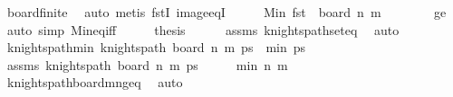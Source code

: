 \begin{isabellebody}
\ board{\isacharunderscore}{\kern0pt}finite\ \isamarkupfalse%
\ auto\ {\isacharparenleft}{\kern0pt}metis\ fstI\ image{\isacharunderscore}{\kern0pt}eqI{\isacharparenright}{\kern0pt}\isanewline
\ \ \isamarkupfalse%
\ \isamarkupfalse%
\ {\isachardoublequoteopen}Min\ {\isacharparenleft}{\kern0pt}{\isacharparenleft}{\kern0pt}fst{\isacharparenright}{\kern0pt}\ {\isacharbackquote}{\kern0pt}\ board\ n\ m{\isacharparenright}{\kern0pt}\ {\isacharequal}{\kern0pt}\ {}{\isachardoublequoteclose}\isanewline
\ \ \ \ \isamarkupfalse%
\ ge{\isacharunderscore}{\kern0pt}{}\ \isamarkupfalse%
\ {\isacharparenleft}{\kern0pt}auto\ simp{\isacharcolon}{\kern0pt}\ Min{\isacharunderscore}{\kern0pt}eq{\isacharunderscore}{\kern0pt}iff{\isacharparenright}{\kern0pt}\isanewline
\ \ \isamarkupfalse%
\ \isamarkupfalse%
\ {\isacharquery}{\kern0pt}thesis\isanewline
\ \ \ \ \isamarkupfalse%
\ assms\ knights{\isacharunderscore}{\kern0pt}path{\isacharunderscore}{\kern0pt}set{\isacharunderscore}{\kern0pt}eq\ \isamarkupfalse%
\ auto\isanewline
{}\isamarkupfalse%
%
\endisatagproof
{\isafoldproof}%
%
\isadelimproof
\isanewline
%
\endisadelimproof
\isanewline
{}\isamarkupfalse%
\ knights{\isacharunderscore}{\kern0pt}path{\isacharunderscore}{\kern0pt}min{}{\isacharcolon}{\kern0pt}\ {\isachardoublequoteopen}knights{\isacharunderscore}{\kern0pt}path\ {\isacharparenleft}{\kern0pt}board\ n\ m{\isacharparenright}{\kern0pt}\ ps\ {\isasymLongrightarrow}\ min{}\ ps\ {\isacharequal}{\kern0pt}\ {}{\isachardoublequoteclose}\isanewline
%
\isadelimproof
%
\endisadelimproof
%
\isatagproof
{}\isamarkupfalse%
\ {\isacharminus}{\kern0pt}\isanewline
\ \ \isamarkupfalse%
\ assms{\isacharcolon}{\kern0pt}\ {\isachardoublequoteopen}knights{\isacharunderscore}{\kern0pt}path\ {\isacharparenleft}{\kern0pt}board\ n\ m{\isacharparenright}{\kern0pt}\ ps{\isachardoublequoteclose}\isanewline
\ \ \isamarkupfalse%
\ \isamarkupfalse%
\ {\isachardoublequoteopen}min\ n\ m\ {\isasymge}\ {}{\isachardoublequoteclose}\isanewline
\ \ \ \ \isamarkupfalse%
\ knights{\isacharunderscore}{\kern0pt}path{\isacharunderscore}{\kern0pt}board{\isacharunderscore}{\kern0pt}m{\isacharunderscore}{\kern0pt}n{\isacharunderscore}{\kern0pt}geq{\isacharunderscore}{\kern0pt}{}\ \isamarkupfalse%
\ auto\isanewline

\end{isabellebody}

